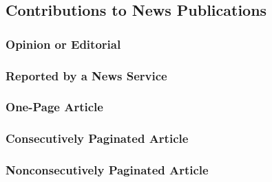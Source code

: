 \documentclass{ltxdockit}
\begin{document}
\subsection{Contributions to News Publications} %
\label{sec:contributions_to_news_publications}
\subsubsection{Opinion or Editorial} %
\label{sub:opinion_or_editorial}
\begin{refsection}
	\printbibliography[heading=none]
\end{refsection}
\subsubsection{Reported by a News Service} %
\label{sub:reported_by_a_news_service}
\begin{refsection}
	\printbibliography[heading=none]
\end{refsection}
\subsubsection{One-Page Article} %
\label{sub:one_page_article}
\begin{refsection}
	\printbibliography[heading=none]
\end{refsection}
\subsubsection{Consecutively Paginated Article} %
\label{sub:consecutively_paginated_article}
\begin{refsection}
	\printbibliography[heading=none]
\end{refsection}
\subsubsection{Nonconsecutively Paginated Article} %
\label{sub:nonconsecutively_paginated_article}
\begin{refsection}
	\printbibliography[heading=none]
\end{refsection}
\end{document}

